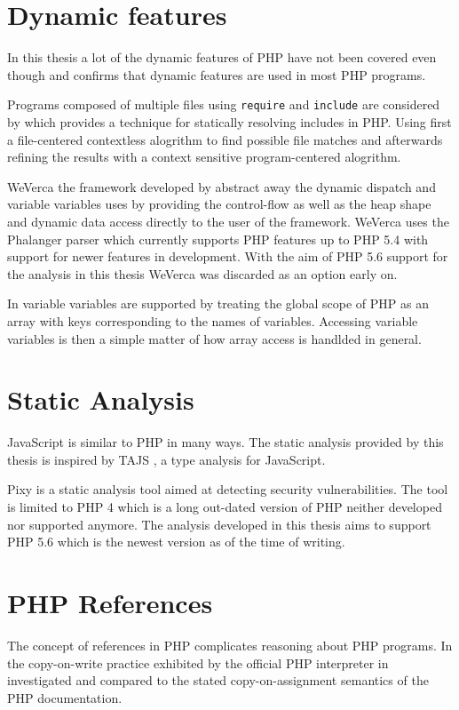 \section{Dynamic features}
In this thesis a lot of the dynamic features of PHP have not been covered even though  and  confirms that dynamic features are used in most PHP programs.

Programs composed of multiple files using \texttt{require} and \texttt{include} are considered by  which provides a technique for statically resolving includes in PHP. Using first a file-centered contextless alogrithm to find possible file matches and afterwards refining the results with a context sensitive program-centered alogrithm.

WeVerca the framework developed by  abstract away the dynamic dispatch and variable variables uses by providing the control-flow as well as the heap shape and dynamic data access directly to the user of the framework. WeVerca uses the Phalanger parser which currently supports PHP features up to PHP 5.4 with support for newer features in development. With the aim of PHP 5.6 support for the analysis in this thesis WeVerca was discarded as an option early on.

In  variable variables are supported by treating the global scope of PHP as an array with keys corresponding to the names of variables. Accessing variable variables is then a simple matter of how array access is handlded in general.

\section{Static Analysis}
JavaScript is similar to PHP in many ways. The static analysis provided by this thesis is inspired by TAJS , a type analysis for JavaScript. 

Pixy  is a static analysis tool aimed at detecting security vulnerabilities. The tool is limited to PHP 4 which is a long out-dated version of PHP neither developed nor supported anymore. The analysis developed in this thesis aims to support PHP 5.6 which is the newest version as of the time of writing.

\section{PHP References}
The concept of references in PHP complicates reasoning about PHP programs. In  the copy-on-write practice exhibited by the official PHP interpreter in investigated and compared to the stated copy-on-assignment semantics of the PHP documentation.

